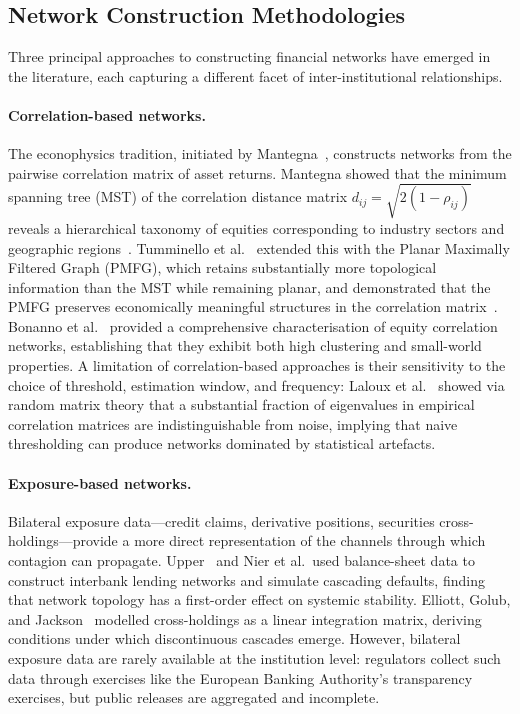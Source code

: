 \subsection{Network Construction Methodologies}
\label{sec:network_construction}

Three principal approaches to constructing financial networks have
emerged in the literature, each capturing a different facet of
inter-institutional relationships.

\paragraph{Correlation-based networks.}
The econophysics tradition, initiated by Mantegna~\cite{mantegna1999hierarchical},
constructs networks from the pairwise correlation matrix of asset
returns.  Mantegna showed that the minimum spanning tree (MST) of the
correlation distance matrix $d_{ij} = \sqrt{2(1-\rho_{ij})}$ reveals a
hierarchical taxonomy of equities corresponding to industry sectors and
geographic regions~\cite{mantegna1999introduction}.  Tumminello
et al.~\cite{tumminello2005tool} extended this with the Planar Maximally
Filtered Graph (PMFG), which retains substantially more topological
information than the MST while remaining planar, and demonstrated that
the PMFG preserves economically meaningful structures in the correlation
matrix~\cite{tumminello2007correlation}.  Bonanno
et al.~\cite{bonanno2004networks} provided a comprehensive
characterisation of equity correlation networks, establishing that they
exhibit both high clustering and small-world properties.  A limitation
of correlation-based approaches is their sensitivity to the choice of
threshold, estimation window, and frequency: Laloux
et al.~\cite{laloux1999noise} showed via random matrix theory that a
substantial fraction of eigenvalues in empirical correlation matrices are
indistinguishable from noise, implying that naive thresholding can
produce networks dominated by statistical artefacts.

\paragraph{Exposure-based networks.}
Bilateral exposure data---credit claims, derivative positions, securities
cross-holdings---provide a more direct representation of the channels
through which contagion can propagate.  Upper~\cite{nier2007network}
and Nier et al.\ used balance-sheet data to construct interbank lending
networks and simulate cascading defaults, finding that network topology
has a first-order effect on systemic stability.  Elliott, Golub, and
Jackson~\cite{elliott2014financial} modelled cross-holdings as a linear
integration matrix, deriving conditions under which discontinuous
cascades emerge.  However, bilateral exposure data are rarely available
at the institution level: regulators collect such data through exercises
like the European Banking Authority's transparency exercises, but public
releases are aggregated and incomplete.

